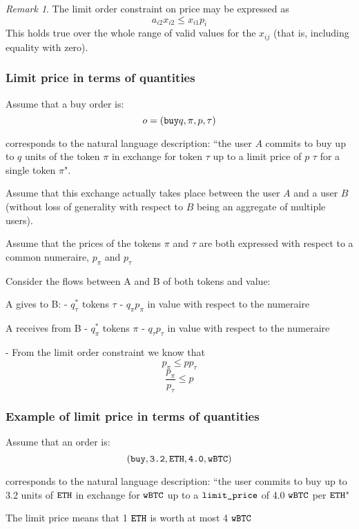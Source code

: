 \documentclass[11pt, reqno]{amsart}
\theoremstyle{definition}
\theoremstyle{remark}
\newtheorem{rmk}{Remark}[subsection]
\newcommand{\BTC}{\textnormal{\texttt{wBTC}}}
\newcommand{\ETH}{\textnormal{\texttt{ETH}}}
\newcommand{\limitprice}{\textnormal{\texttt{limit\_price}}}
\newcommand{\buy}{\textnormal{\texttt{buy}}}
\begin{document}
\begin{rmk}
The limit order constraint on price may be expressed as
\[
    a_{i2} x_{i2} \leq x_{i1} p_i
\]
This holds true over the whole range of valid values for the $x_{ij}$
(that is, including equality with zero).
\end{rmk}

\subsubsection{Limit price in terms of quantities}
Assume that a buy order is:
\[
	o = (\buy q, \pi, p, \tau)
\]

corresponds to the natural language description:
``the user $A$ commits to buy up to $q$ units of the token $\pi$ in exchange
for token $\tau$ up to a limit price of $p$ $\tau$ for a single token
$\pi$".

Assume that this exchange actually takes place between the user $A$ and a user
$B$ (without loss of generality with respect to $B$ being an aggregate of
multiple users).

Assume that the prices of the tokens $\pi$ and $\tau$ are both expressed with
respect to a common numeraire, $p_{\pi}$ and $p_{\tau}$

Consider the flows between A and B of both tokens and value:

A gives to B:
- $q^*_{\tau}$ tokens $\tau$
- $q_{\pi} p_{\pi}$ in value with respect to the numeraire

A receives from B
- $q^*_{\pi}$ tokens $\pi$
- $q_{\tau} p_{\tau}$ in value with respect to the numeraire

- From the limit order constraint we know that
  $$p_{\pi} \le p p_{\tau}$$
  $$\frac{p_{\pi}}{p_{\tau}} \le p$$

\subsubsection{Example of limit price in terms of quantities}
Assume that an order is:
\[
  (\buy, \textnormal{\texttt{3.2}}, \ETH, \textnormal{\texttt{4.0}}, \BTC)
\]

corresponds to the natural language description:
``the user commits to buy up to 3.2 units of $\ETH$ in exchange for $\BTC$ up
to a $\limitprice$ of 4.0 $\BTC$ per $\ETH$"

The limit price means that 1 $\ETH$ is worth at most 4 $\BTC$

\end{document}
